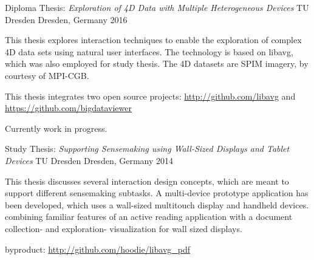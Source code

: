 \begin{cventries}

  \cventry
    {Diploma Thesis: \quad
      \textit{Exploration of 4D Data with Multiple Heterogeneous Devices}}
    {TU Dresden}
    {Dresden, Germany}
    {2016}
    {
      \begin{cvitems}
      \item[]{
          This thesis explores interaction techniques to enable the exploration of complex 4D data sets using natural user interfaces.
          The technology is based on libavg, which was also employed for study thesis.
          The 4D datasets are SPIM imagery, by courtesy of MPI-CGB.
        }
      \item[]{This thesis integrates two open source projects: \url{http://github.com/libavg} and \url{https://github.com/bigdataviewer}}
      \item[]{Currently work in progress.}
      \end{cvitems}
    }

  \cventry
    {Study Thesis:\quad
      \textit{Supporting Sensemaking using Wall-Sized Displays and Tablet Devices}}
    {TU Dresden}
    {Dresden, Germany}
    {2014}
    {
      \begin{cvitems}
      \item[] {
        This thesis discusses several interaction design concepts,
        which are meant to support different sensemaking subtasks.
        A multi-device prototype application has been developed,
        which uses a wall-sized multitouch display and handheld devices.
        combining familiar features of an active reading application with a document collection- and exploration- visualization for wall sized displays.
        }
      \item[] {byproduct: \url{http://github.com/hoodie/libavg_pdf}}
      \end{cvitems}
    }


\end{cventries}
